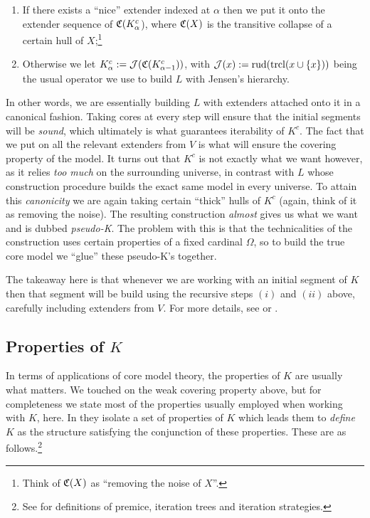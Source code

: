 \documentclass[../../main]{subfiles}
\begin{document}
\begin{enumerate}
  \item If there exists a ``nice'' extender indexed at $\alpha$ then we put it onto the extender sequence of $\mathfrak C(K^c_\alpha$), where $\mathfrak C(X)$ is the transitive collapse of a certain hull of $X$;\footnote{Think of $\mathfrak C(X)$ as ``removing the noise of $X$''.}
  \item Otherwise we let $K^c_\alpha := \operatorname{\mathcal J}(\mathfrak C(K^c_{\alpha-1}))$, with $\operatorname{\mathcal J}(x):=\text{rud}(\operatorname{trcl}(x\cup\{x\}))$ being the usual operator we use to build $L$ with Jensen's hierarchy.\\
\end{enumerate}

In other words, we are essentially building $L$ with extenders attached onto it in a canonical fashion. Taking cores at every step will ensure that the initial segments will be \textit{sound}, which ultimately is what guarantees iterability of $K^c$. The fact that we put on all the relevant extenders from $V$ is what will ensure the covering property of the model. It turns out that $K^c$ is not exactly what we want however, as it relies \textit{too much} on the surrounding universe, in contrast with $L$ whose construction procedure builds the exact same model in every universe. To attain this \textit{canonicity} we are again taking certain ``thick'' hulls of $K^c$ (again, think of it as removing the noise). The resulting construction \textit{almost} gives us what we want and is dubbed \textit{pseudo-K}. The problem with this is that the technicalities of the construction uses certain properties of a fixed cardinal $\Omega$, so to build the true core model we ``glue'' these pseudo-K's together.

\qquad The takeaway here is that whenever we are working with an initial segment of $K$ then that segment will be build using the recursive steps $(i)$ and $(ii)$ above, carefully including extenders from $V$. For more details, see \cite{Kwithoutmeasurable} or \cite{MSc}.

\subsection{Properties of $K$}

In terms of applications of core model theory, the properties of $K$ are usually what matters. We touched on the weak covering property above, but for completeness we state most of the properties usually employed when working with $K$, here. In \cite{Kwithoutmeasurable} they isolate a set of properties of $K$ which leads them to \textit{define} $K$ as the structure satisfying the conjunction of these properties. These are as follows.\footnote{See \cite{steel2010outline} for definitions of premice, iteration trees and iteration strategies.}
\end{document}

